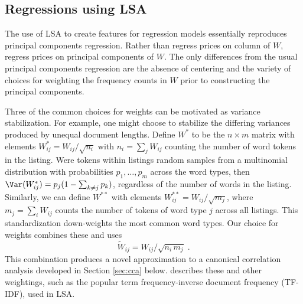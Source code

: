 \documentclass[12pt]{article}
\begin{document}
 \subsection{ Regressions using LSA }  %
 \label{sec:regrUsingLSA}
 
 The use of LSA to create features for regression models essentially reproduces
 principal components regression.  Rather than regress prices on column of $W$,
 regress prices on principal components of $W$.  The only differences from the 
 usual principal components regression are the absence of centering and the 
 variety of choices for weighting the frequency counts in $W$ prior
 to constructing the principal components.
 

 Three of the common choices for weights can be motivated as variance stabilization. 
 For example, one might choose to stabilize the differing variances produced by 
 unequal document lengths.  Define
 ${W}^{*}$ to be the $n \times m$ matrix with elements ${W}^{*}_{ij} =
 W_{ij}/\sqrt{n_i}$ with $n_i = \sum_j W_{ij}$ counting the number of word
 tokens in the \ith listing.  Were tokens within listings random samples from a
 multinomial distribution with probabilities $p_{1}, \ldots, p_{m}$ across the word types,
 then $\Var({W}^{*}_{ij}) = p_j(1-\sum_{k\ne j} p_k)$, regardless of the
 number of words in the listing.  Similarly, we can define $W^{**}$ with elements
 $W^{**}_{ij} = W_{ij}/\sqrt{m_j}$, where $m_j = \sum_i W_{ij}$ counts the
 number of tokens of word type $j$ across all listings. This standardization
 down-weights the most common word types.  Our choice for weights combines these and uses
  \begin{equation}
   \widetilde{W}_{ij} = W_{ij}/\sqrt{n_i\,m_j} \;.
  \label{eq:Wtij}
  \end{equation}
  This combination produces a novel approximation to a canonical correlation analysis developed in Section \ref{sec:cca} below. \citet{turney10} describes these and other weightings, such as the popular term frequency-inverse document
 frequency (TF-IDF),  used in LSA. 
  
  
 
\end{document}
